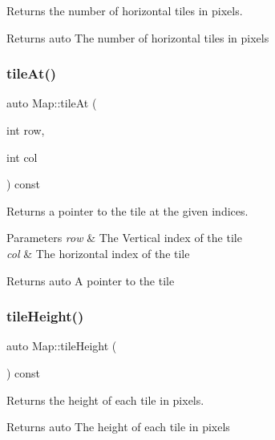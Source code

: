 Returns the number of horizontal tiles in pixels. 

\begin{DoxyReturn}{Returns}
auto The number of horizontal tiles in pixels 
\end{DoxyReturn}
\mbox{\label{classMap_a901031825f0a02cfc888e6748c47d672}} 
\subsubsection{\texorpdfstring{tileAt()}{tileAt()}}
{\footnotesize\ttfamily auto Map\+::tile\+At (\begin{DoxyParamCaption}\item[{int}]{row,  }\item[{int}]{col }\end{DoxyParamCaption}) const\hspace{0.3cm}{\ttfamily [inline]}}



Returns a pointer to the tile at the given indices. 


\begin{DoxyParams}{Parameters}
{\em row} & The Vertical index of the tile\\
\hline
{\em col} & The horizontal index of the tile\\
\hline
\end{DoxyParams}
\begin{DoxyReturn}{Returns}
auto A pointer to the tile 
\end{DoxyReturn}
\mbox{\label{classMap_ac722cf9e28d26a31155b505b42aa439f}} 
\subsubsection{\texorpdfstring{tileHeight()}{tileHeight()}}
{\footnotesize\ttfamily auto Map\+::tile\+Height (\begin{DoxyParamCaption}{ }\end{DoxyParamCaption}) const\hspace{0.3cm}{\ttfamily [inline]}}



Returns the height of each tile in pixels. 

\begin{DoxyReturn}{Returns}
auto The height of each tile in pixels 
\end{DoxyReturn}
\mbox{\label{classMap_aad00fc857019548a36d64436d03360e9}} 
